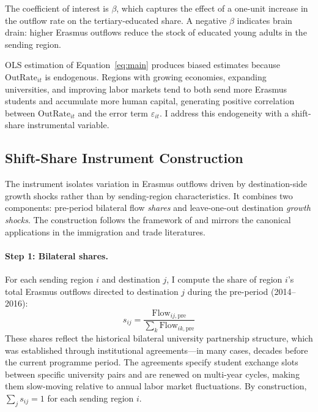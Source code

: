 \documentclass[12pt]{article}
\begin{document}
The coefficient of interest is $\beta$, which captures the effect of a one-unit increase in the outflow rate on the tertiary-educated share. A negative $\beta$ indicates brain drain: higher Erasmus outflows reduce the stock of educated young adults in the sending region.

OLS estimation of Equation~\eqref{eq:main} produces biased estimates because $\text{OutRate}_{it}$ is endogenous. Regions with growing economies, expanding universities, and improving labor markets tend to both send more Erasmus students and accumulate more human capital, generating positive correlation between $\text{OutRate}_{it}$ and the error term $\varepsilon_{it}$. I address this endogeneity with a shift-share instrumental variable.

\subsection{Shift-Share Instrument Construction}
\label{sec:iv_construction}

The instrument isolates variation in Erasmus outflows driven by destination-side growth shocks rather than by sending-region characteristics. It combines two components: pre-period bilateral flow \textit{shares} and leave-one-out destination \textit{growth shocks}. The construction follows the framework of \citet{borusyak_hull_jaravel_2022} and mirrors the canonical applications in the immigration \citep{card_2001} and trade \citep{autor_dorn_hanson_2013} literatures.

\paragraph{Step 1: Bilateral shares.} For each sending region $i$ and destination $j$, I compute the share of region $i$'s total Erasmus outflows directed to destination $j$ during the pre-period (2014--2016):
\begin{equation}
s_{ij} = \frac{\text{Flow}_{ij,\text{pre}}}{\sum_k \text{Flow}_{ik,\text{pre}}}
\label{eq:shares}
\end{equation}
These shares reflect the historical bilateral university partnership structure, which was established through institutional agreements---in many cases, decades before the current programme period. The agreements specify student exchange slots between specific university pairs and are renewed on multi-year cycles, making them slow-moving relative to annual labor market fluctuations. By construction, $\sum_j s_{ij} = 1$ for each sending region $i$.
\end{document}
